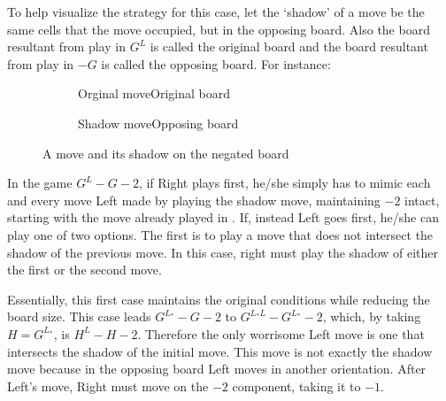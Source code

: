 To help visualize the strategy for this case, let the `shadow' of a move be the same cells that the move occupied, but in the opposing board. Also the board resultant from play in $G^L$ is called the original board and the board resultant from play in $-G$ is called the opposing board. For instance:

\begin{figure}[h]
	\centering
	\begin{subfigure}{0.17\linewidth} \centering
		\caption*{\hspace{0.1cm}Orginal move\newline Original board}
	\end{subfigure}
	\hspace{1cm}
	\begin{subfigure}{0.17\linewidth} \centering
		\caption*{\hspace{0.15cm}Shadow move\newline Opposing board}
	\end{subfigure}
\caption{A move and its shadow on the negated board}
\end{figure}

In the game $G^L -G -2$, if Right plays first, he/she simply has to mimic each and every move Left made by playing the shadow move, maintaining $-2$ intact, starting with the move already played in . If, instead Left goes first, he/she can play one of two options. The first is to play a move that does not intersect the shadow of the previous move. In this case, right must play the shadow of either the first or the second move.

Essentially, this first case maintains the original conditions while reducing the board size. This case leads $G^{L_*} -G -2$ to $G^{L_*L} -G^{L_*} -2$, which, by taking $H = G^{L_*}$, is $H^{L} -H -2$. Therefore the only worrisome Left move is one that intersects the shadow of the initial move. This move is not exactly the shadow move because in the opposing board Left moves in another orientation. After Left's move, Right must move on the $-2$ component, taking it to $-1$.

